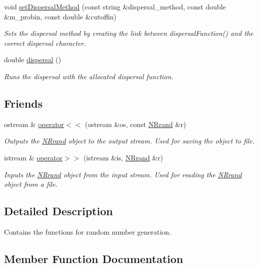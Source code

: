 \begin{DoxyCompactItemize}
void \hyperlink{class_n_rrand_a432b648073ccd3cb7f8215bb5c299619}{set\+Dispersal\+Method} (const string \&dispersal\+\_\+method, const double \&m\+\_\+probin, const double \&cutoffin)
\begin{DoxyCompactList}\small\item\em Sets the dispersal method by creating the link between dispersal\+Function() and the correct dispersal character. \end{DoxyCompactList}\item 
double \hyperlink{class_n_rrand_a1e15746ff8398488245b750325f37b08}{dispersal} ()
\begin{DoxyCompactList}\small\item\em Runs the dispersal with the allocated dispersal function. \end{DoxyCompactList}\end{DoxyCompactItemize}
\subsection*{Friends}
\begin{DoxyCompactItemize}
\item 
ostream \& \hyperlink{class_n_rrand_a604ebc1c878ab63df21e123dbd34185f}{operator$<$$<$} (ostream \&os, const \hyperlink{class_n_rrand}{N\+Rrand} \&r)
\begin{DoxyCompactList}\small\item\em Outputs the \hyperlink{class_n_rrand}{N\+Rrand} object to the output stream. Used for saving the object to file. \end{DoxyCompactList}\item 
istream \& \hyperlink{class_n_rrand_a0b8544414e90bb92ba90afa881b1f06e}{operator$>$$>$} (istream \&is, \hyperlink{class_n_rrand}{N\+Rrand} \&r)
\begin{DoxyCompactList}\small\item\em Inputs the \hyperlink{class_n_rrand}{N\+Rrand} object from the input stream. Used for reading the \hyperlink{class_n_rrand}{N\+Rrand} object from a file. \end{DoxyCompactList}\end{DoxyCompactItemize}


\subsection{Detailed Description}
Contains the functions for random number generation. 

\subsection{Member Function Documentation}
